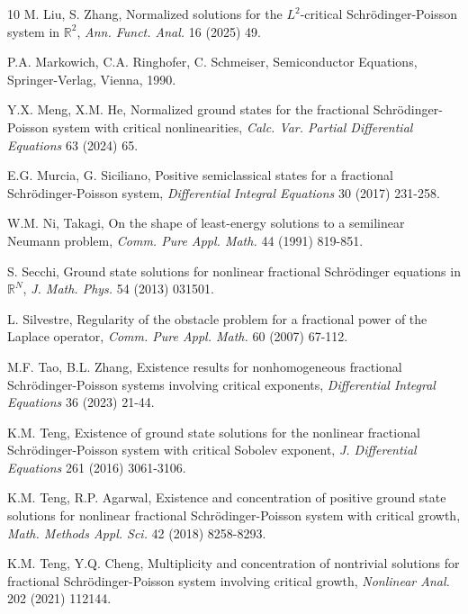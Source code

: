 \documentclass[reqno, 11pt]{amsart} %
\numberwithin{equation}{section}
\begin{document}
\begin{thebibliography}{10}
		M. Liu, S. Zhang,
		Normalized solutions for the $L^{2}$-critical Schr\"{o}dinger-Poisson system in $\mathbb{R}^{2}$,
		{\em Ann. Funct. Anal.} 16 (2025) 49.
		
		
		
		
		
		
		P.A. Markowich, C.A. Ringhofer, C. Schmeiser,
		Semiconductor Equations, Springer-Verlag, Vienna, 1990.
		
		
		
		
		Y.X. Meng, X.M. He,
		Normalized ground states for the fractional Schr\"{o}dinger-Poisson system with critical nonlinearities,
		{\em Calc. Var. Partial Differential Equations} 63 (2024) 65.
		
		E.G. Murcia, G. Siciliano,
		Positive semiclassical states for a fractional Schr\"{o}dinger-Poisson system,
		{\em Differential Integral Equations} 30 (2017) 231-258.
		
		
		W.M. Ni, Takagi,
		On the shape of least-energy solutions to a semilinear Neumann problem, {\em Comm. Pure Appl. Math.} 44 (1991) 819-851.
		
		S. Secchi, 
		Ground state solutions for nonlinear fractional Schr\"{o}dinger equations in $\mathbb{R}^{N}$,
		{\em J. Math. Phys.} 54 (2013) 031501.
		
		L. Silvestre,
		Regularity of the obstacle problem for a fractional power of the Laplace operator, {\em Comm. Pure Appl. Math.} 60 (2007) 67-112.
		
		M.F. Tao, B.L. Zhang,
		Existence results for nonhomogeneous fractional Schr\"{o}dinger-Poisson systems involving critical exponents,
		{\em Differential Integral Equations} 36 (2023) 21-44.
		
		
		K.M. Teng,
		Existence of ground state solutions for the nonlinear fractional Schr\"{o}dinger-Poisson system with critical Sobolev exponent,
		{\em J. Differential Equations} 261 (2016) 3061-3106.
		
		
		 K.M. Teng, R.P. Agarwal,
		Existence and concentration of positive ground state solutions for nonlinear fractional Schr\"{o}dinger-Poisson system with critical growth, {\em Math. Methods Appl. Sci.} 42 (2018) 8258-8293.
		
		K.M. Teng, Y.Q. Cheng,
		Multiplicity and concentration of nontrivial solutions for fractional Schr\"{o}dinger-Poisson system involving critical growth, {\em Nonlinear Anal.} 202 (2021) 112144.
		

\end{thebibliography}
\end{document}
